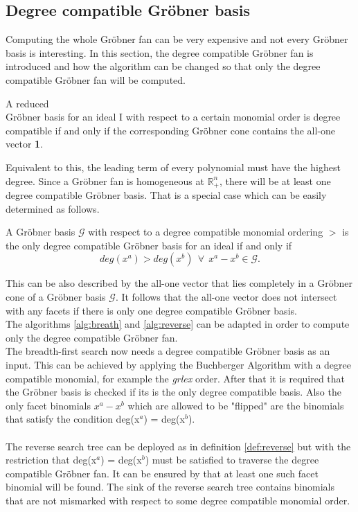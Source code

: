 \subsection{Degree compatible Gröbner basis}
\label{subsec:degreecomp}
Computing the whole Gröbner fan can be very expensive and not every Gröbner basis is interesting.
In this section, the degree compatible Gröbner fan is introduced and how the algorithm can
be changed so that only the degree compatible Gröbner fan will be computed.\\
\begin{env_definition}
\cite{dueckpaper}
A reduced \\ Gröbner basis for an ideal I with respect to a certain monomial order is
degree compatible if and only if the corresponding Gröbner cone contains the all-one vector \textbf{1}.
\end{env_definition}
Equivalent to this, the leading term of every polynomial must have the highest degree.
Since a Gröbner fan is homogeneous at $\mathbb{R}^{n}_{+}$, there will be at least one degree compatible Gröbner basis.
That is a special case which can be easily determined as follows.

\begin{env_definition}
\cite{dueckpaper}
A Gröbner basis $\mathcal{G}$ with respect to a degree compatible monomial ordering $>$  is the only degree compatible Gröbner basis for an ideal if and only if
\[ deg(x^{a}) > deg(x^{b})~~ \forall~~ x^{a}-x^{b}\in \mathcal{G}. \] 
\end{env_definition}

This can be also described by the all-one vector that lies completely in a Gröbner cone of a Gröbner basis $\mathcal{G}$.
It follows that the all-one vector does not intersect with any facets if there is only one degree compatible Gröbner basis. \\

The algorithms \ref{alg:breath} and \ref{alg:reverse} can be adapted in order to compute only the degree compatible Gröbner fan.\\ 
The breadth-first search now needs a degree compatible Gröbner basis as an input. This can be achieved by applying the Buchberger Algorithm with a degree compatible monomial, for example the \textit{grlex} order. After that it is required that the Gröbner basis is checked if its is the only degree compatible basis. %
Also the only facet binomials $x^{a} - x^{b}$ which are allowed to be "flipped" are the binomials that satisfy the condition
deg(x$^{a}$) = deg(x$^{b}$). \\ \\
The reverse search tree can be deployed as in definition \ref{def:reverse} but with the restriction that deg(x$^{a}$) = deg(x$^{b}$) must be satisfied to traverse the degree compatible Gröbner fan.
It can be ensured by \cite{dueckpaper} that at least one such facet binomial will be found. 
The sink of the reverse search tree contains binomials that are not mismarked with respect to some degree compatible monomial order. 

